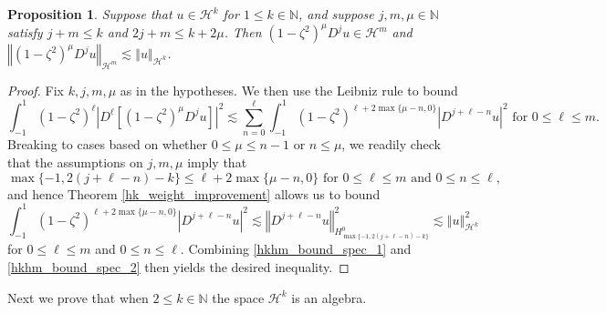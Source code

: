 \documentclass[11pt,reqno]{amsart}
\numberwithin{equation}{section}
\providecommand{\abs}[1]{\left\vert#1\right\vert}
\providecommand{\norm}[1]{\left\Vert#1\right\Vert}
\def\ls{\lesssim}
\providecommand{\abs}[1]{\left\vert#1\right\vert}
\providecommand{\norm}[1]{\left\Vert#1\right\Vert}
\def\ls{\lesssim}
\def\h{\mathcal{H}}
\def\N{\mathbb{N}}
\newtheorem{prop}[lem]{Proposition}
\begin{document}
\begin{prop}\label{hkhm_bound_spec}
Suppose that $u \in \h^k$ for $1 \le k \in \N$, and suppose $j,m,\mu \in \N$  satisfy  $j+m \le k$ and $2j +m \le k+2\mu$.  Then    $(1-\zeta^2)^\mu D^j u \in \h^m$ and $\norm{(1-\zeta^2)^\mu D^j u }_{\h^m} \ls \norm{u}_{\h^k}$.
\end{prop}
\begin{proof}
Fix $k,j,m,\mu$ as in the hypotheses.  We then use the Leibniz rule  to bound
\begin{equation}\label{hkhm_bound_spec_1}
 \int_{-1}^1 (1-\zeta^2)^\ell \abs{ D^\ell [ (1-\zeta^2)^\mu D^j u]   }^2 \ls  \sum_{n=0}^\ell \int_{-1}^1 (1-\zeta^2)^{\ell + 2 \max\{\mu-n,0\} } \abs{D^{j+\ell-n}u}^2 \text{ for } 0 \le \ell \le m.
\end{equation}
Breaking to cases based on whether $0\le \mu \le n-1$ or $n \le \mu$, we readily check that the assumptions on $j,m,\mu$ imply that 
\begin{equation}
 \max\{-1,2(j+\ell-n)-k\} \le \ell + 2 \max\{\mu-n,0\} \text{ for } 0 \le \ell \le m \text{ and } 0 \le n \le \ell,
\end{equation}
and hence Theorem \ref{hk_weight_improvement} allows us to bound 
\begin{equation}\label{hkhm_bound_spec_2}
 \int_{-1}^1 (1-\zeta^2)^{\ell + 2 \max\{\mu-n,0\} } \abs{D^{j+\ell-n}u}^2  \ls \norm{D^{j+\ell-n} u}_{H^0_{\max\{-1,2(j+\ell-n)-k\}}}^2 \ls \norm{u}_{\h^k}^2
\end{equation}
for $0 \le \ell \le m$ and $0 \le n \le \ell$.  Combining \eqref{hkhm_bound_spec_1} and \eqref{hkhm_bound_spec_2} then yields the desired inequality.
\end{proof}


Next we prove that when $2 \le k \in \N$ the space $\h^k$ is an algebra.
\end{document}
